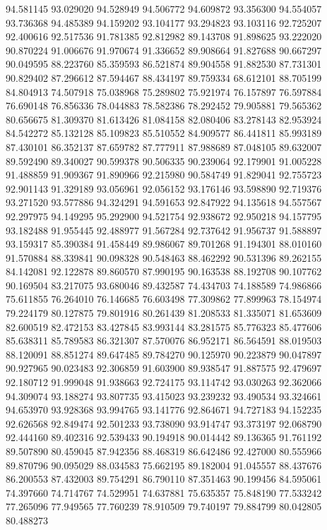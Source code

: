 94.581145
93.029020
94.528949
94.506772
94.609872
93.356300
94.554057
93.736368
94.485389
94.159202
93.104177
93.294823
93.103116
92.725207
92.400616
92.517536
91.781385
92.812982
89.143708
91.898625
93.222020
90.870224
91.006676
91.970674
91.336652
89.908664
91.827688
90.667297
90.049595
88.223760
85.359593
86.521874
89.904558
91.882530
87.731301
90.829402
87.296612
87.594467
88.434197
89.759334
68.612101
88.705199
84.804913
74.507918
75.038968
75.289802
75.921974
76.157897
76.597884
76.690148
76.856336
78.044883
78.582386
78.292452
79.905881
79.565362
80.656675
81.309370
81.613426
81.084158
82.080406
83.278143
82.953924
84.542272
85.132128
85.109823
85.510552
84.909577
86.441811
85.993189
87.430101
86.352137
87.659782
87.777911
87.988689
87.048105
89.632007
89.592490
89.340027
90.599378
90.506335
90.239064
92.179901
91.005228
91.488859
91.909367
91.890966
92.215980
90.584749
91.829041
92.755723
92.901143
91.329189
93.056961
92.056152
93.176146
93.598890
92.719376
93.271520
93.577886
94.324291
94.591653
92.847922
94.135618
94.557567
92.297975
94.149295
95.292900
94.521754
92.938672
92.950218
94.157795
93.182488
91.955445
92.488977
91.567284
92.737642
91.956737
91.588897
93.159317
85.390384
91.458449
89.986067
89.701268
91.194301
88.010160
91.570884
88.339841
90.098328
90.548463
88.462292
90.531396
89.262155
84.142081
92.122878
89.860570
87.990195
90.163538
88.192708
90.107762
90.169504
83.217075
93.680046
89.432587
74.434703
74.188589
74.986866
75.611855
76.264010
76.146685
76.603498
77.309862
77.899963
78.154974
79.224179
80.127875
79.801916
80.261439
81.208533
81.335071
81.653609
82.600519
82.472153
83.427845
83.993144
83.281575
85.776323
85.477606
85.638311
85.789583
86.321307
87.570076
86.952171
86.564591
88.019503
88.120091
88.851274
89.647485
89.784270
90.125970
90.223879
90.047897
90.927965
90.023483
92.306859
91.603900
89.938547
91.887575
92.479697
92.180712
91.999048
91.938663
92.724175
93.114742
93.030263
92.362066
94.309074
93.188274
93.807735
93.415023
93.239232
93.490534
93.324661
94.653970
93.928368
93.994765
93.141776
92.864671
94.727183
94.152235
92.626568
92.849474
92.501233
93.738090
93.914747
93.373197
92.068790
92.444160
89.402316
92.539433
90.194918
90.014442
89.136365
91.761192
89.507890
80.459045
87.942356
88.468319
86.642486
92.427000
80.555966
89.870796
90.095029
88.034583
75.662195
89.182004
91.045557
88.437676
86.200553
87.432003
89.754291
86.790110
87.351463
90.199456
84.595061
74.397660
74.714767
74.529951
74.637881
75.635357
75.848190
77.533242
77.265096
77.949565
77.760239
78.910509
79.740197
79.884799
80.042805
80.488273

